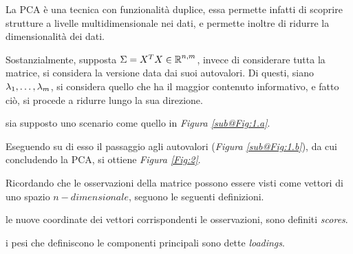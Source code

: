 \documentclass{subfiles}
\begin{document}
La PCA è una tecnica con funzionalità duplice, essa permette infatti di scoprire strutture a livelle multidimensionale nei dati,
e permette inoltre di ridurre la dimensionalità dei dati.

Sostanzialmente, supposta $\Sigma = X^{T}X \in \operatorname{\mathbb{R}}^{n, m}$, invece di considerare tutta la matrice,
si considera la versione data dai suoi autovalori. Di questi, siano ${\lambda}_{1}, \ldots, {\lambda}_{m}$, si considera quello che ha il maggior contenuto informativo,
e fatto ciò, si procede a ridurre lungo la sua direzione.

\begin{Example*}
    sia supposto uno scenario come quello in \emph{Figura \ref{sub@Fig:1.a}}.
    
    Eseguendo su di esso il passaggio agli autovalori (\emph{Figura \ref{sub@Fig:1.b}}),
    da cui concludendo la PCA, si ottiene \emph{Figura \ref{Fig:2}}.
    
\end{Example*}

Ricordando che le osservazioni della matrice possono essere visti come vettori di uno spazio $n-dimensionale$, seguono le seguenti definizioni.
\begin{Definition*}
    le nuove coordinate dei vettori corrispondenti le osservazioni, sono definiti \emph{scores}.
\end{Definition*}
\begin{Definition*}
    i pesi che definiscono le componenti principali sono dette \emph{loadings}.
\end{Definition*}
\end{document}
